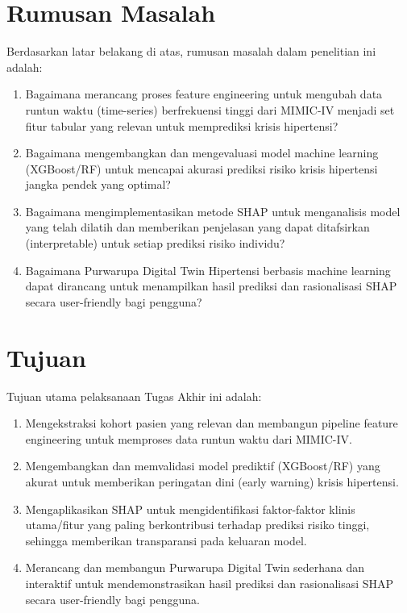 \section{Rumusan Masalah}
Berdasarkan latar belakang di atas, rumusan masalah dalam penelitian ini adalah:
\begin{enumerate}
\item Bagaimana merancang proses feature engineering untuk mengubah data runtun waktu (time-series) berfrekuensi tinggi dari MIMIC-IV menjadi set fitur tabular yang relevan untuk memprediksi krisis hipertensi?
\item Bagaimana mengembangkan dan mengevaluasi model machine learning (XGBoost/RF) untuk mencapai akurasi prediksi risiko krisis hipertensi jangka pendek yang optimal?
\item Bagaimana mengimplementasikan metode SHAP untuk menganalisis model yang telah dilatih dan memberikan penjelasan yang dapat ditafsirkan (interpretable) untuk setiap prediksi risiko individu?
\item Bagaimana Purwarupa Digital Twin Hipertensi berbasis machine learning dapat dirancang untuk menampilkan hasil prediksi dan rasionalisasi SHAP secara user-friendly bagi pengguna?
\end{enumerate}

\section{Tujuan}
Tujuan utama pelaksanaan Tugas Akhir ini adalah:
\begin{enumerate}
\item Mengekstraksi kohort pasien yang relevan dan membangun pipeline feature engineering untuk memproses data runtun waktu dari MIMIC-IV.
\item Mengembangkan dan memvalidasi model prediktif (XGBoost/RF) yang akurat untuk memberikan peringatan dini (early warning) krisis hipertensi.
\item Mengaplikasikan SHAP untuk mengidentifikasi faktor-faktor klinis utama/fitur yang paling berkontribusi terhadap prediksi risiko tinggi, sehingga memberikan transparansi pada keluaran model.
\item Merancang dan membangun Purwarupa Digital Twin sederhana dan interaktif untuk mendemonstrasikan hasil prediksi dan rasionalisasi SHAP secara user-friendly bagi pengguna.
\end{enumerate}

